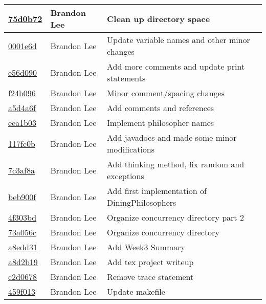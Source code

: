 \documentclass[letterpaper,10pt,titlepage]{article}
\begin{document}
\begin{tabular}{l l l}
\href{https://github.com/brandonlee503/Operating-Systems-II/commit/75d0b72e1b4b91fc2057d10d87a03a75eb67383d}{75d0b72} & Brandon Lee & Clean up directory space\\\hline
\href{https://github.com/brandonlee503/Operating-Systems-II/commit/0001e6daaec0b0f958ba177dcd431b63eae1c593}{0001e6d} & Brandon Lee & Update variable names and other minor changes\\\hline
\href{https://github.com/brandonlee503/Operating-Systems-II/commit/e56d09079e03367e583ac72250e33728a0d651a1}{e56d090} & Brandon Lee & Add more comments and update print statements\\\hline
\href{https://github.com/brandonlee503/Operating-Systems-II/commit/f24b096ff0f0c0306da301b8b54d4a3d7d75cd19}{f24b096} & Brandon Lee & Minor comment/spacing changes\\\hline
\href{https://github.com/brandonlee503/Operating-Systems-II/commit/a5d4a6fa3e3d981bdc98e1979dc407d143a3874f}{a5d4a6f} & Brandon Lee & Add comments and references\\\hline
\href{https://github.com/brandonlee503/Operating-Systems-II/commit/eea1b0342c27bc634419978453ae710d02eef85e}{eea1b03} & Brandon Lee & Implement philosopher names\\\hline
\href{https://github.com/brandonlee503/Operating-Systems-II/commit/117fc0bda999c55c5b1fb011a8e9fc6d84470767}{117fc0b} & Brandon Lee & Add javadocs and made some minor modifications\\\hline
\href{https://github.com/brandonlee503/Operating-Systems-II/commit/7c3af8a0c4de6a4ef03ce9d7af2b7af8cfbe0861}{7c3af8a} & Brandon Lee & Add thinking method, fix random and exceptions\\\hline
\href{https://github.com/brandonlee503/Operating-Systems-II/commit/beb900f767ccafaac3462b5a68be9627587657f3}{beb900f} & Brandon Lee & Add first implementation of DiningPhilosophers\\\hline
\href{https://github.com/brandonlee503/Operating-Systems-II/commit/4f303bd6cf93f8a6238d2ab0bf7f0f57d3c1ae0b}{4f303bd} & Brandon Lee & Organize concurrency directory part 2\\\hline
\href{https://github.com/brandonlee503/Operating-Systems-II/commit/73a056c5ce444a03cd56196fd8ba6bb013f1bde9}{73a056c} & Brandon Lee & Organize concurrency directory\\\hline
\href{https://github.com/brandonlee503/Operating-Systems-II/commit/a8edd31487ed8d84660f5a795dc0a6f779d2c8fe}{a8edd31} & Brandon Lee & Add Week3 Summary\\\hline
\href{https://github.com/brandonlee503/Operating-Systems-II/commit/a8d2b19686aef30634d471643cad88dcd91c080f}{a8d2b19} & Brandon Lee & Add tex project writeup\\\hline
\href{https://github.com/brandonlee503/Operating-Systems-II/commit/c2d067844a4f23e6a33d7c7e4e9ffcece90510cb}{c2d0678} & Brandon Lee & Remove trace statement\\\hline
\href{https://github.com/brandonlee503/Operating-Systems-II/commit/459f01316fb990f1fd9ffa1fa6348fe736128d6c}{459f013} & Brandon Lee & Update makefile\\\hline
\end{tabular}
\end{document}
